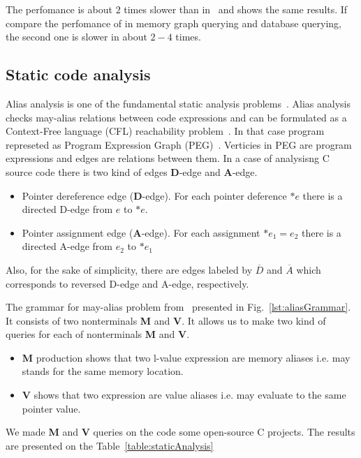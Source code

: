 The perfomance is about $2$ times slower than in~\cite{GrigorevR16} and shows the same results.
If compare the perfomance of in memory graph querying and database querying, the second one is slower in about $2-4$ times.


\subsection{Static code analysis}

Alias analysis is one of the fundamental static analysis problems~\cite{Marlowe}.
Alias analysis checks may-alias relations between code expressions and can be formulated as a Context-Free language (CFL) reachability problem~\cite{Reps}.
In that case program represeted as Program Expression Graph (PEG)~\cite{Zheng}.
Verticies in PEG are program expressions and edges are relations between them.
In a case of analysisng C source code there is two kind of edges \textbf{D}-edge and \textbf{A}-edge.

\begin{itemize}
    \item Pointer dereference edge (\textbf{D}-edge). For each pointer deference $*e$ there is a directed D-edge from $e$ to $*e$.
    \item Pointer assignment edge (\textbf{A}-edge). For each assignment $*e_1=e_2$ there is a directed A-edge from $e_2$ to $*e_1$
\end{itemize}

Also, for the sake of simplicity, there are edges labeled by $\overline{D}$ and $\overline{A}$ which corresponds to reversed D-edge and A-edge, respectively.

The grammar for may-alias problem from~\cite{Zheng} presented in Fig.~\ref{lst:aliasGrammar}.
It consists of two nonterminals \textbf{M} and \textbf{V}.
It allows us to make two kind of queries for each of nonterminals \textbf{M} and \textbf{V}.

\begin{itemize}
    \item \textbf{M} production shows that two l-value expression are memory aliases i.e. may stands for the same memory location.
    \item \textbf{V} shows that two expression are value aliases i.e. may evaluate to the same pointer value.
\end{itemize}

We made \textbf{M} and \textbf{V} queries on the code some open-source C projects.
The results are presented on the Table~\ref{table:staticAnalysis} 

